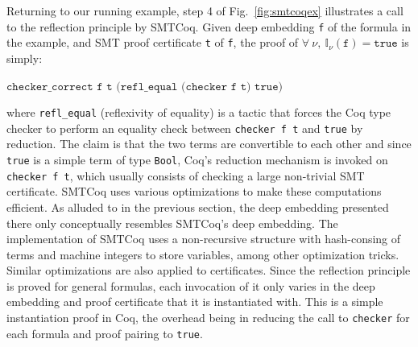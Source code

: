 \documentclass{article}
\begin{document}
	Returning to our running example, 
	step 4 of 
	Fig.~\ref{fig:smtcoqex} illustrates
	a call to the reflection principle by
	SMTCoq. Given 
	deep embedding \texttt{f}
	of the formula in the example, and 
	SMT proof certificate \texttt{t} of 
	\texttt{f}, the proof of $\forall\ \nu,\ 
	\mathbb{I}_{\nu}(\texttt{f}) = 
	\texttt{true}$ is simply:
	\begin{center}
		$\texttt{checker\_correct f t
			(refl\_equal (checker f t) true)}$
	\end{center}
	where \texttt{refl\_equal} 
	(reflexivity of equality) is a tactic
	that forces the Coq type checker to 
	perform an equality check between 
	\texttt{checker f t} and 
	\texttt{true} by reduction. 
	The claim is that the two 
	terms are convertible to each other
	and since \texttt{true} is a simple 
	term of type \texttt{Bool}, 
	Coq's reduction mechanism is 
	invoked on \texttt{checker f t},
	which usually consists of checking
	a large non-trivial SMT certificate. 
	SMTCoq uses various optimizations 
	to make these computations efficient.
	As alluded to in the previous section,
	the deep embedding presented there 
	only conceptually resembles SMTCoq's
	deep embedding. The implementation 
	of SMTCoq uses a non-recursive 
	structure with hash-consing of terms
	and machine integers to store variables,
	among other optimization tricks.
	Similar optimizations are also 
	applied to certificates.
	Since the reflection principle is 
	proved for general formulas, 
	each invocation of it only varies
	in the deep embedding and proof 
	certificate that it is instantiated
	with. This is a simple instantiation
	proof in Coq, the overhead
	being in reducing the call to 
	\texttt{checker} for each 
	formula and proof pairing to 
	\texttt{true}.
	
\end{document}
